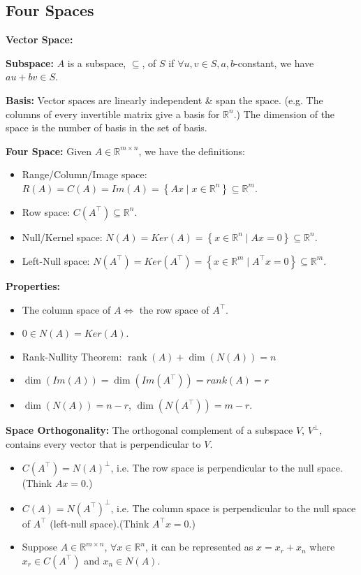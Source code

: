 \documentclass[14pt]{article}
\theoremstyle{definition}
\theoremstyle{remark}
\begin{document}
\begin{multicols}{2}
    \section{Four Spaces}
    \textbf{Vector Space:}

    \textbf{Subspace:}  $A$ is a subspace, $\subseteq$, of $S$ if $\forall u, v \in S, a, b$-constant, we have
    $au + bv \in S$.

    \textbf{Basis:} Vector spaces are linearly independent \& span the space. (e.g. The columns of every invertible matrix give a basis for $\mathbb{R}^n$.) The dimension of the space is the number of basis in the set of basis.

    \textbf{Four Space:} Given $A \in \mathbb{R}^{m \times n}$, we have the definitions:
    \begin{itemize}
        \item Range/Column/Image space: $R(A)=C(A)=Im(A)=\left\{A x \mid x \in \mathbb{R}^{n}\right\} \subseteq \mathbb{R}^{m}$.
        \item Row space: $C(A^\top)\subseteq \mathbb{R}^{n}$.
        \item Null/Kernel space: $N(A)=Ker(A)=\left\{x \in \mathbb{R}^{n} \mid A x=0\right\}\subseteq \mathbb{R}^{n}$.
        \item Left-Null space: $N(A^\top)=Ker(A^\top)=\left\{x \in \mathbb{R}^{m} \mid A^\top x=0\right\}\subseteq \mathbb{R}^{m}$.
    \end{itemize}
    \textbf{Properties:}
    \begin{itemize}
        \item The column space of $A \Longleftrightarrow$ the row space of $A^\top$.
        \item $0\in N(A)=Ker(A)$.
        \item Rank-Nullity Theorem: $\operatorname{rank}(A)+\operatorname{\dim}(N(A))=n$
        \item $\operatorname{\dim}(Im(A)) = \operatorname{\dim}(Im(A^\top)) = rank(A) = r$
        \item $\operatorname{\dim}(N(A)) = n - r$, $\operatorname{\dim}(N(A^\top)) = m - r$.
    \end{itemize}

    \textbf{Space Orthogonality:}
    The orthogonal complement of a subspace $V$, $V^\perp$, contains every vector that is perpendicular to $V$.
    \begin{itemize}
        \item $C(A^\top) = N(A)^\perp$, i.e. The row space is perpendicular to the null space. (Think $Ax = 0$.)
        \item $C(A) = N(A^\top)^\perp$, i.e. The column space is perpendicular to the null space of $A^\top$ (left-null space).(Think $A^\top x = 0$.)
        \item Suppose $A\in \mathbb{R}^{m\times n}$, $\forall x\in \mathbb{R}^n$, it can be represented as $x = x_r + x_n$ where $x_r \in C(A^\top)$ and $x_n \in N(A)$.
    \end{itemize}


\end{multicols}
\end{document}
